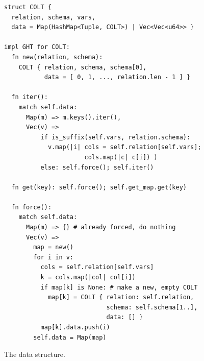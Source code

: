 

\begin{figure}
  \begin{lstlisting}
struct COLT {
  relation, schema, vars, 
  data = Map(HashMap<Tuple, COLT>) | Vec<Vec<u64>> }

impl GHT for COLT:
  fn new(relation, schema):
    COLT { relation, schema, schema[0],
           data = [ 0, 1, ..., relation.len - 1 ] }

  fn iter():
    match self.data:
      Map(m) => m.keys().iter(),
      Vec(v) => 
          if is_suffix(self.vars, relation.schema):
            v.map(|i| cols = self.relation[self.vars];
                      cols.map(|c| c[i]) )
          else: self.force(); self.iter()

  fn get(key): self.force(); self.get_map.get(key)

  fn force():
    match self.data:
      Map(m) => {} # already forced, do nothing
      Vec(v) => 
        map = new()
        for i in v:
          cols = self.relation[self.vars]
          k = cols.map(|col| col[i])
          if map[k] is None: # make a new, empty COLT
            map[k] = COLT { relation: self.relation, 
                            schema: self.schema[1..], 
                            data: [] }
          map[k].data.push(i)
        self.data = Map(map)
  \end{lstlisting}
  \caption{The \COLT data structure.}
  \label{fig:colt-impl}
\end{figure}


